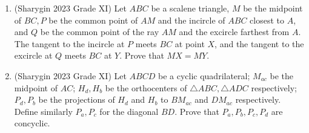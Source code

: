 \documentclass[11pt]{scrartcl}
\begin{document}
\begin{enumerate}
    \item (Sharygin 2023 Grade XI) Let $ABC$ be a scalene triangle, $M$ be the midpoint of $BC,P$ be the common point of $AM$ and the incircle of $ABC$ closest to $A$, and $Q$ be the common point of the ray $AM$ and the excircle farthest from $A$. The tangent to the incircle at $P$ meets $BC$ at point $X$, and the tangent to the excircle at $Q$ meets $BC$ at $Y$. Prove that $MX=MY$.

    \item (Sharygin 2023 Grade XI) Let $ABCD$ be a cyclic quadrilateral; $M_{ac}$ be the midpoint of $AC$; $H_d,H_b$ be the orthocenters of $\triangle ABC,\triangle ADC$ respectively; $P_d,P_b$ be the projections of $H_d$ and $H_b$ to $BM_{ac}$ and $DM_{ac}$ respectively. Define similarly $P_a,P_c$ for the diagonal $BD$. Prove that $P_a,P_b,P_c,P_d$ are concyclic.

\end{enumerate}
\end{document}
